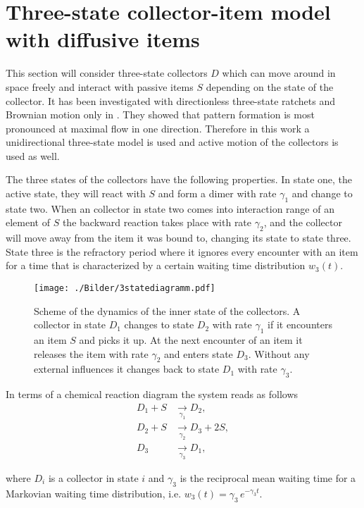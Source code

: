 \section{Three-state collector-item model with diffusive items} \label{sec:sheepndog}

This section will consider three-state collectors $D$ which can move around in space freely and interact with passive items $S$ depending on the state of the collector.
It has been investigated with directionless three-state ratchets and Brownian motion only in \cite{SeefeldSchim00}.
They showed that pattern formation is most pronounced at maximal flow in one direction.
Therefore in this work a unidirectional three-state model is used and active motion of the collectors is used as well.

The three states of the collectors have the following properties.
In state one, the active state, they will react with $S$ and form a dimer with rate $\gamma_1$ and change to state two.
When an collector in state two comes into interaction range of an element of $S$ the backward reaction takes place with rate $\gamma_2$, and the collector will move away from the item it was bound to, changing its state to state three.
State three is the refractory period where it ignores every encounter with an item for a time that is characterized by a certain waiting time distribution $w_3(t)$.

\begin{figure}[H]
\centering
  \texttt{[image: ./Bilder/3statediagramm.pdf]}
\caption{
    Scheme of the dynamics of the inner state of the collectors.
    A collector in state $D_1$ changes to state $D_2$ with rate $\gamma_1$ if it encounters an item $S$ and picks it up.
    At the next encounter of an item it releases the item with rate $\gamma_2$ and enters state $D_3$.
    Without any external influences it changes back to state $D_1$ with rate $\gamma_3$.
}
\end{figure}

In terms of a chemical reaction diagram the system reads as follows
\begin{align}
 \nonumber D_1+S &\underset{\gamma_1}{\rightarrow} D_2,\\
 \nonumber D_2+S &\underset{\gamma_2}{\rightarrow} D_3+2 S,\\
 \label{eq:3ds_chemeq} D_3 &\underset{\gamma_3}{\rightarrow} D_1,
\end{align}

where $D_i$ is a collector in state $i$ and $\gamma_3$ is the reciprocal mean waiting time for a Markovian waiting time distribution, i.e. $w_3(t)=\gamma_3\,e^{-\gamma_3 t}$.

